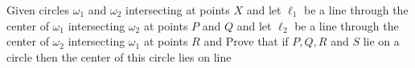 Given circles $ \omega_1$ and $ \omega_2$ intersecting at points $ X$ and  let $ \ell_1$ be a line through the center of $ \omega_1$ intersecting $ \omega_2$ at points $ P$ and $ Q$ and let $ \ell_2$ be a line through the center of $ \omega_2$ intersecting $ \omega_1$ at points $ R$ and   Prove that if $ P, Q, R$ and $ S$ lie on a circle then the center of this circle lies on line 